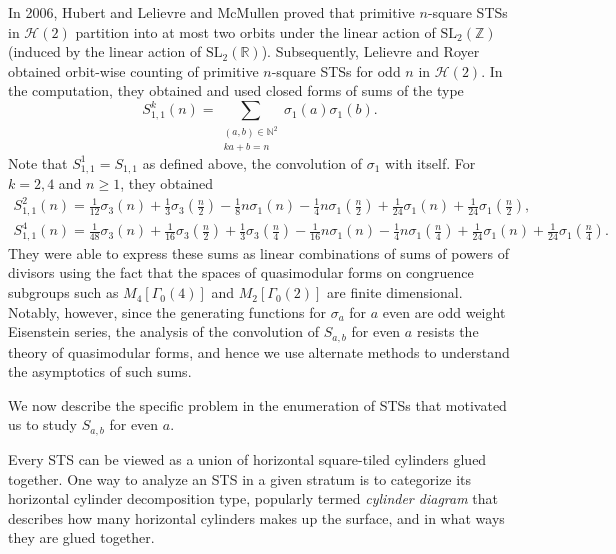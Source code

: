 \documentclass[12pt]{amsart}
\numberwithin{equation}{section}
\numberwithin{theorem}{section}
\newcommand{\RR}{\mathbb{R}}
\newcommand{\calH}{\mathcal{H}}
\newcommand{\ZZ}{\mathbb{Z}}
\newcommand{\NN}{\mathbb{N}}
\newcommand{\SL}{\mathrm{SL}}
\begin{document}
In 2006, Hubert and Lelievre \cite{HubLel} and McMullen \cite{McMullen} proved that primitive $n$-square STSs in $\calH(2)$ partition into at most two orbits under the linear action of $\SL_2(\ZZ)$ (induced by the linear action of $\SL_2(\RR)$). Subsequently, Lelievre and Royer \cite{LelRoy} obtained orbit-wise counting of primitive $n$-square STSs for odd $n$ in $\calH(2)$. In the computation, they obtained and used closed forms of sums of the type
$$ 
S_{1,1}^k(n) = \sum_{\substack{(a,b) \in \NN^2 \\ ka +b = n}} \sigma_1(a)\sigma_1(b).
$$
Note that $S_{1,1}^1 = S_{1,1}$ as defined above, the convolution of $\sigma_1$ with itself. For $k=2, 4$ and $n\geq 1$,  they obtained
\begin{gather*}
S_{1,1}^2(n) = \frac{1}{12}\sigma_3(n) + \frac{1}{3}\sigma_3\left(\frac{n}{2}\right) - \frac{1}{8}n \sigma_1(n) - \frac{1}{4}n\sigma_1\left(\frac{n}{2}\right) + \frac{1}{24}\sigma_1(n) + \frac{1}{24}\sigma_1\left(\frac{n}{2}\right),\\
S_{1,1}^4(n) = \frac{1}{48}\sigma_3(n) + \frac{1}{16}\sigma_3\left(\frac{n}{2}\right) + \frac{1}{3}\sigma_3\left(\frac{n}{4}\right) - \frac{1}{16}n \sigma_1(n) - \frac{1}{4}n\sigma_1\left(\frac{n}{4}\right) + \frac{1}{24}\sigma_1(n) + \frac{1}{24}\sigma_1\left(\frac{n}{4}\right).
\end{gather*}
They were able to express these sums as linear combinations of sums of powers of divisors using the fact that the spaces of quasimodular forms on congruence subgroups such as $M_4[\Gamma_0(4)]$ and $M_2[\Gamma_0(2)]$ are finite dimensional. Notably, however, since the generating functions for $\sigma_a$ for $a$ even are odd weight Eisenstein series, the analysis of the  convolution of $S_{a,b}$ for even $a$ resists the theory of quasimodular forms, and hence we use alternate methods to understand the asymptotics of such sums. 

We now describe the specific problem in the enumeration of STSs that motivated us to study $S_{a,b}$ for even $a$.  

Every STS can be viewed as a union of horizontal square-tiled cylinders glued together. One way to analyze an STS in a given stratum is to categorize its horizontal cylinder decomposition type, popularly termed \emph{cylinder diagram} that describes how many horizontal cylinders makes up the surface, and in what ways they are glued together. 
\end{document}
